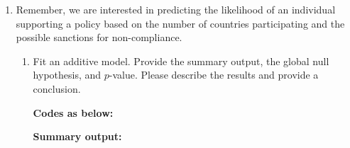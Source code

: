 \documentclass[12pt,letterpaper]{article}
\begin{document}
\begin{enumerate}
	\item
	Remember, we are interested in predicting the likelihood of an individual supporting a policy based on the number of countries participating and the possible sanctions for non-compliance.
	\begin{enumerate}
		\item [] Fit an additive model. Provide the summary output, the global null hypothesis, and $p$-value. Please describe the results and provide a conclusion.
			\vspace{.25cm}
		
		\noindent \textbf{Codes as below:}
		
 		\newpage
		
		\noindent \textbf{Summary output:}
		

\end{enumerate}
\end{enumerate}
\end{document}
